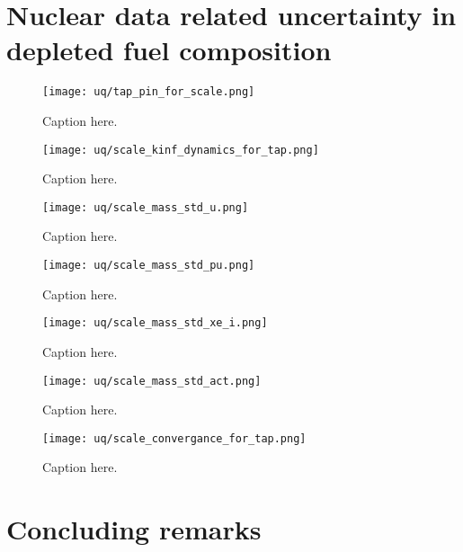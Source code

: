 \section{Nuclear data related uncertainty in depleted fuel composition}

\begin{figure}[hbp!] %
	\centering
	\texttt{[image: uq/tap\_pin\_for\_scale.png]}
	\caption{Caption here.}
	\label{fig:uq-tap-pincell}
\end{figure}
\begin{figure}[hbp!] %
	\centering
	\texttt{[image: uq/scale\_kinf\_dynamics\_for\_tap.png]}
	\caption{Caption here.}
	\label{fig:uq-scale-kinf}
\end{figure}
\begin{figure}[hbp!] %
	\centering
	\texttt{[image: uq/scale\_mass\_std\_u.png]}
	\caption{Caption here.}
	\label{fig:uq-scale-u}
\end{figure}

\begin{figure}[hbp!] %
	\centering
	\texttt{[image: uq/scale\_mass\_std\_pu.png]}
	\caption{Caption here.}
	\label{fig:uq-scale-pu}
\end{figure}
\begin{figure}[hbp!] %
	\centering
	\texttt{[image: uq/scale\_mass\_std\_xe\_i.png]}
	\caption{Caption here.}
	\label{fig:uq-scale-xe-i}
\end{figure}
\begin{figure}[hbp!] %
	\centering
	\texttt{[image: uq/scale\_mass\_std\_act.png]}
	\caption{Caption here.}
	\label{fig:uq-scale-act}
\end{figure}

\begin{figure}[hbp!] %
	\centering
	\texttt{[image: uq/scale\_convergance\_for\_tap.png]}
	\caption{Caption here.}
	\label{fig:uq-scale-convergance}
\end{figure}

\section{Concluding remarks}